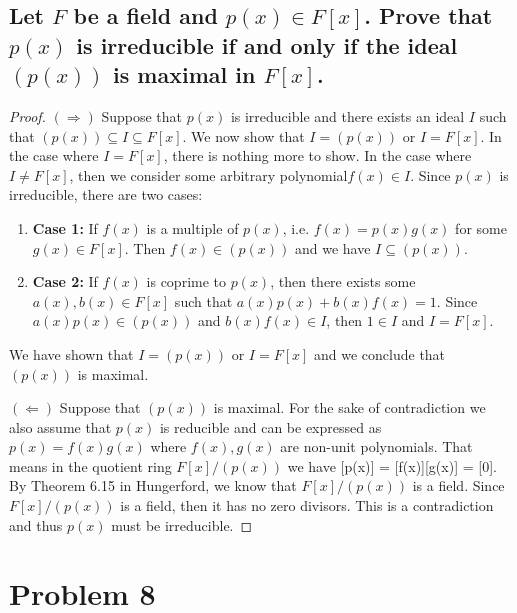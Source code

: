 \documentclass{article}
\theoremstyle{plain} %
\theoremstyle{definition} %
\begin{document}
\subsection*{Let $F$ be a field and $p(x) \in F[x]$. Prove that $p(x)$ is irreducible
if and only if the ideal $(p(x))$ is maximal in $F[x]$.}
\begin{proof}
    $(\Rightarrow)$ Suppose that $p(x)$ is irreducible and there exists an ideal $I$ such that $(p(x)) \subseteq I \subseteq F[x]$.
    We now show that $I = (p(x))$ or $I = F[x]$. In the case where $I = F[x]$, there is nothing more to show.
    In the case where $I \neq F[x]$, then we consider some arbitrary polynomial$f(x) \in I$.
    Since $p(x)$ is irreducible, there are two cases:
    \begin{enumerate}
        \item \textbf{Case 1:} If $f(x)$ is a multiple of $p(x)$, i.e. $f(x) = p(x)g(x)$ for some $g(x) \in F[x]$.
        Then $f(x) \in (p(x))$ and we have $I \subseteq (p(x))$.
        \item \textbf{Case 2:} If $f(x)$ is coprime to $p(x)$, then there exists some $a(x), b(x) \in F[x]$ such that $a(x)p(x) + b(x)f(x) = 1$.
        Since $a(x)p(x) \in (p(x))$ and $b(x)f(x) \in I$, then $1 \in I$ and $I = F[x]$.
    \end{enumerate}
    We have shown that $I = (p(x))$ or $I = F[x]$ and we conclude that $(p(x))$ is maximal.

    $(\Leftarrow)$ Suppose that $(p(x))$ is maximal. For the sake of contradiction we also assume that $p(x)$
    is reducible and can be expressed as $p(x) = f(x)g(x)$ where $f(x), g(x)$ are non-unit polynomials. That means in the quotient ring $F[x]/(p(x))$ we have
    [p(x)] = [f(x)][g(x)] = [0]. By Theorem 6.15 in Hungerford, we know that $F[x]/(p(x))$ is a field. 
    Since $F[x]/(p(x))$ is a field, then it has no zero divisors. This is a contradiction and thus $p(x)$ must be irreducible.
\end{proof}

\section*{Problem 8}
\end{document}
